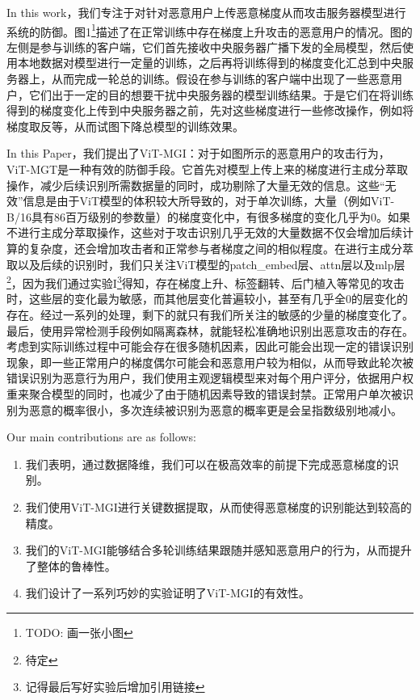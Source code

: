 \documentclass[conference]{IEEEtran}
\begin{document}
In this work，我们专注于对针对恶意用户上传恶意梯度从而攻击服务器模型进行系统的防御。图1\footnote{TODO: 画一张小图}描述了在正常训练中存在梯度上升攻击的恶意用户的情况。图的左侧是参与训练的客户端，它们首先接收中央服务器广播下发的全局模型，然后使用本地数据对模型进行一定量的训练，之后再将训练得到的梯度变化汇总到中央服务器上，从而完成一轮总的训练。假设在参与训练的客户端中出现了一些恶意用户，它们出于一定的目的想要干扰中央服务器的模型训练结果。于是它们在将训练得到的梯度变化上传到中央服务器之前，先对这些梯度进行一些修改操作，例如将梯度取反等，从而试图下降总模型的训练效果。

In this Paper，我们提出了ViT-MGI：对于如图所示的恶意用户的攻击行为，ViT-MGT是一种有效的防御手段。它首先对模型上传上来的梯度进行主成分萃取操作，减少后续识别所需数据量的同时，成功剔除了大量无效的信息。这些“无效”信息是由于ViT模型的体积较大所导致的，对于单次训练，大量（例如ViT-B/16具有86百万级别的参数量）的梯度变化中，有很多梯度的变化几乎为0。如果不进行主成分萃取操作，这些对于攻击识别几乎无效的大量数据不仅会增加后续计算的复杂度，还会增加攻击者和正常参与者梯度之间的相似程度。在进行主成分萃取以及后续的识别时，我们只关注ViT模型的patch\_embed层、attn层以及mlp层\footnote{待定}，因为我们通过实验I\footnote{记得最后写好实验后增加引用链接}得知，存在梯度上升、标签翻转、后门植入等常见的攻击时，这些层的变化最为敏感，而其他层变化普遍较小，甚至有几乎全0的层变化的存在。经过一系列的处理，剩下的就只有我们所关注的敏感的少量的梯度变化了。最后，使用异常检测手段例如隔离森林，就能轻松准确地识别出恶意攻击的存在。考虑到实际训练过程中可能会存在很多随机因素，因此可能会出现一定的错误识别现象，即一些正常用户的梯度偶尔可能会和恶意用户较为相似，从而导致此轮次被错误识别为恶意行为用户，我们使用主观逻辑模型来对每个用户评分，依据用户权重来聚合模型的同时，也减少了由于随机因素导致的错误封禁。正常用户单次被识别为恶意的概率很小，多次连续被识别为恶意的概率更是会呈指数级别地减小。

Our main contributions are as follows:

\begin{enumerate}
    \item 我们表明，通过数据降维，我们可以在极高效率的前提下完成恶意梯度的识别。
    \item 我们使用ViT-MGI进行关键数据提取，从而使得恶意梯度的识别能达到较高的精度。
    \item 我们的ViT-MGI能够结合多轮训练结果跟随并感知恶意用户的行为，从而提升了整体的鲁棒性。
    \item 我们设计了一系列巧妙的实验证明了ViT-MGI的有效性。
\end{enumerate}
\end{document}
